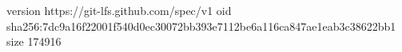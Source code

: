 version https://git-lfs.github.com/spec/v1
oid sha256:7dc9a16f22001f540d0ec30072bb393e7112be6a116ca847ae1eab3c38622bb1
size 174916
